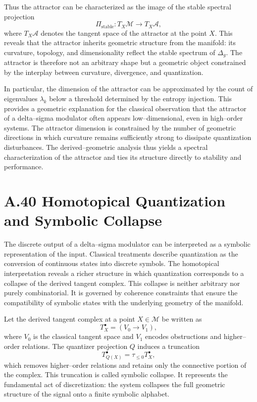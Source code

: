 Thus the attractor can be characterized as the image of the stable spectral projection
\[
\Pi_{\mathrm{stable}} : T_X\mathcal{M} \longrightarrow T_X\mathcal{A},
\]
where \(T_X\mathcal{A}\) denotes the tangent space of the attractor at the point \(X\). This reveals that the attractor inherits geometric structure from the manifold: its curvature, topology, and dimensionality reflect the stable spectrum of \(\Delta_g\). The attractor is therefore not an arbitrary shape but a geometric object constrained by the interplay between curvature, divergence, and quantization.

In particular, the dimension of the attractor can be approximated by the count of eigenvalues \(\lambda_k\) below a threshold determined by the entropy injection. This provides a geometric explanation for the classical observation that the attractor of a delta–sigma modulator often appears low–dimensional, even in high–order systems. The attractor dimension is constrained by the number of geometric directions in which curvature remains sufficiently strong to dissipate quantization disturbances. The derived–geometric analysis thus yields a spectral characterization of the attractor and ties its structure directly to stability and performance.

\section{A.40 Homotopical Quantization and Symbolic Collapse}

The discrete output of a delta–sigma modulator can be interpreted as a symbolic representation of the input. Classical treatments describe quantization as the conversion of continuous states into discrete symbols. The homotopical interpretation reveals a richer structure in which quantization corresponds to a collapse of the derived tangent complex. This collapse is neither arbitrary nor purely combinatorial. It is governed by coherence constraints that ensure the compatibility of symbolic states with the underlying geometry of the manifold.

Let the derived tangent complex at a point \(X \in \mathcal{M}\) be written as
\[
T_X^\bullet = \left( V_0 \to V_1 \right),
\]
where \(V_0\) is the classical tangent space and \(V_1\) encodes obstructions and higher–order relations. The quantizer projection \(Q\) induces a truncation
\[
T_{Q(X)}^\bullet = \tau_{\le 0} T_X^\bullet,
\]
which removes higher–order relations and retains only the connective portion of the complex. This truncation is called symbolic collapse. It represents the fundamental act of discretization: the system collapses the full geometric structure of the signal onto a finite symbolic alphabet.

